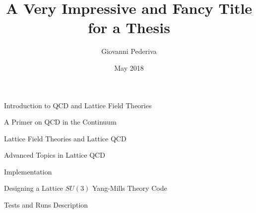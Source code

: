\documentclass[twoside,english, a4paper, 11pt]{shared/uiofysmaster}
\author{Giovanni Pederiva}
\title{\bf{A Very Impressive and Fancy Title for a Thesis}}
\date{May 2018}
\begin{document}


\maketitle
\clearpage

\tableofcontents
\clearpage

\begin{abstract}
	
\end{abstract}
\begin{acknowledgements}
	
\end{acknowledgements}

\begin{part}{Introduction to QCD and Lattice Field Theories}
	\label{part:intro}
	\begin{chapter}{A Primer on QCD in the Continuum}
		\label{chap:qcd_intro}
  		
	\end{chapter}

	\begin{chapter}{Lattice Field Theories and Lattice QCD}
		\label{chap:lattice_intro}
	  	
	\end{chapter}

	\begin{chapter}{Advanced Topics in Lattice QCD}
		\label{chap:grad_intro}
	  	
	\end{chapter}

\end{part}


\begin{part}{Implementation}
	\begin{chapter}{Designing a Lattice $SU(3)$ Yang-Mills Theory Code}
  		\label{chap:code_design}
  		
	\end{chapter}

	\begin{chapter}{Tests and Runs Description}
		\label{chap:test_runs}
		
  \end{chapter}
\end{part}
\end{document}
